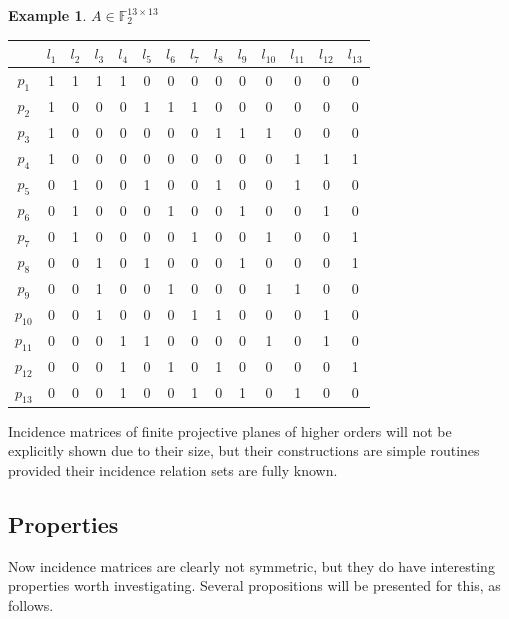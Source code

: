 \documentclass{report}
\newcommand{\F}{\mathbb{F}}
\theoremstyle{definition}\newtheorem*{definition}{Definition}
\theoremstyle{definition}\newtheorem*{example}{Example}
\theoremstyle{remark}\newtheorem*{remark}{Remark}
\begin{document}
\begin{example}
$ A \in \F_2^{13 \times 13} $ \\
\begin{center}
\begin{tabular}{|c|c|c|c|c|c|c|c|c|c|c|c|c|c|}
\hline
& $ l_1 $ & $ l_2 $ & $ l_3 $ & $ l_4 $ & $ l_5 $ & $ l_6 $ & $ l_7 $ & $ l_8 $ & $ l_9 $ & $ l_{10} $ & $ l_{11} $ & $ l_{12} $ & $ l_{13} $ \\
\hline
$ p_1 $ & 1 & 1 & 1 & 1 & 0 & 0 & 0 & 0 & 0 & 0 & 0 & 0 & 0 \\
\hline
$ p_2 $ & 1 & 0 & 0 & 0 & 1 & 1 & 1 & 0 & 0 & 0 & 0 & 0 & 0 \\
\hline
$ p_3 $ & 1 & 0 & 0 & 0 & 0 & 0 & 0 & 1 & 1 & 1 & 0 & 0 & 0 \\
\hline
$ p_4 $ & 1 & 0 & 0 & 0 & 0 & 0 & 0 & 0 & 0 & 0 & 1 & 1 & 1 \\
\hline
$ p_5 $ & 0 & 1 & 0 & 0 & 1 & 0 & 0 & 1 & 0 & 0 & 1 & 0 & 0 \\
\hline
$ p_6 $ & 0 & 1 & 0 & 0 & 0 & 1 & 0 & 0 & 1 & 0 & 0 & 1 & 0 \\
\hline
$ p_7 $ & 0 & 1 & 0 & 0 & 0 & 0 & 1 & 0 & 0 & 1 & 0 & 0 & 1 \\
\hline
$ p_8 $ & 0 & 0 & 1 & 0 & 1 & 0 & 0 & 0 & 1 & 0 & 0 & 0 & 1 \\
\hline
$ p_9 $ & 0 & 0 & 1 & 0 & 0 & 1 & 0 & 0 & 0 & 1 & 1 & 0 & 0 \\
\hline
$ p_{10} $ & 0 & 0 & 1 & 0 & 0 & 0 & 1 & 1 & 0 & 0 & 0 & 1 & 0 \\
\hline
$ p_{11} $ & 0 & 0 & 0 & 1 & 1 & 0 & 0 & 0 & 0 & 1 & 0 & 1 & 0 \\
\hline
$ p_{12} $ & 0 & 0 & 0 & 1 & 0 & 1 & 0 & 1 & 0 & 0 & 0 & 0 & 1 \\
\hline
$ p_{13} $ & 0 & 0 & 0 & 1 & 0 & 0 & 1 & 0 & 1 & 0 & 1 & 0 & 0 \\
\hline
\end{tabular}
\end{center}
\end{example}

Incidence matrices of finite projective planes of higher orders will not be explicitly shown due to their size, but their constructions are simple routines provided their incidence relation sets are fully known.

\subsection{Properties}

Now incidence matrices are clearly not symmetric, but they do have interesting properties worth investigating. Several propositions will be presented for this, as follows.
\end{document}
